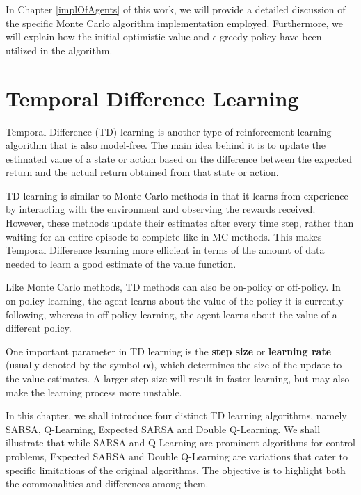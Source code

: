In Chapter \ref{implOfAgents} of this work, we will provide a detailed discussion of the specific Monte Carlo algorithm implementation employed. Furthermore, we will explain how  the initial optimistic value and $\epsilon$-greedy policy have been utilized in the algorithm.

\section{Temporal Difference Learning}
Temporal Difference (TD) learning is another type of reinforcement learning algorithm that is also model-free. The main idea behind it is to update the estimated value of a state or action based on the difference between the expected return and the actual return obtained from that state or action. 

TD learning is similar to Monte Carlo methods in that it learns from experience by interacting with the environment and observing the rewards received. However, these methods update their estimates after every time step, rather than waiting for an entire episode to complete like in MC methods. This makes Temporal Difference learning more efficient in terms of the amount of data needed to learn a good estimate of the value function.

Like Monte Carlo methods, TD methods can also be on-policy or off-policy. In on-policy learning, the agent learns about the value of the policy it is currently following, whereas in off-policy learning, the agent learns about the value of a different policy. 

One important parameter in TD learning is the \textbf{step size} or \textbf{learning rate} (usually denoted by the symbol $\bm{\alpha}$), which determines the size of the update to the value estimates. A larger step size will result in faster learning, but may also make the learning process more unstable.

In this chapter, we shall introduce four distinct TD learning algorithms, namely SARSA, Q-Learning, Expected SARSA and Double Q-Learning. We shall illustrate that while SARSA and Q-Learning are prominent algorithms for control problems, Expected SARSA and Double Q-Learning are variations that cater to specific limitations of the original algorithms. The objective is to highlight both the commonalities and differences among them.


